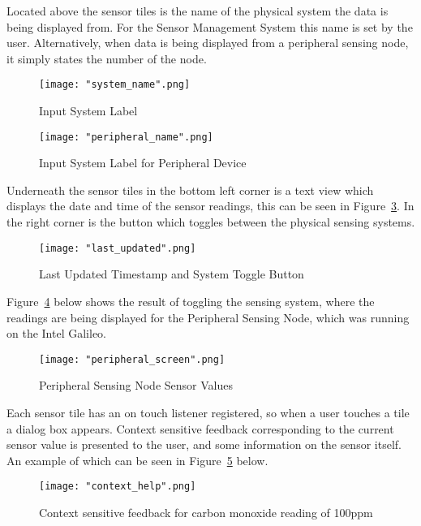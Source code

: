 \documentclass{article}
\begin{document}
\noindent
Located above the sensor tiles is the name of the physical system the data is being displayed from. For the Sensor Management System this name is set by the user. Alternatively, when data is being displayed from a peripheral sensing node, it simply states the number of the node.
\begin{figure}[H]
\centering
\texttt{[image: "system\_name".png]}
\caption{Input System Label}
\label{fig:android_sensor_input_system}
\end{figure}

\begin{figure}[H]
\centering
\texttt{[image: "peripheral\_name".png]}
\caption{Input System Label for Peripheral Device}
\label{fig:android_sensor_input_system_peripheral}
\end{figure}

\noindent
Underneath the sensor tiles in the bottom left corner is a text view which displays the date and time of the sensor readings, this can be seen in Figure~\ref{fig:android_sensor_timestamp}. In the right corner is the button which toggles between the physical sensing systems.
\begin{figure}[H]
\centering
\texttt{[image: "last\_updated".png]}
\caption{Last Updated Timestamp and System Toggle Button}
\label{fig:android_sensor_timestamp}
\end{figure}

\noindent
Figure~\ref{fig:android_peripheral_sensing_values} below shows the result of toggling the sensing system, where the readings are being displayed for the Peripheral Sensing Node, which was running on the Intel Galileo.
\begin{figure}[H]
\centering
\texttt{[image: "peripheral\_screen".png]}
\caption{Peripheral Sensing Node Sensor Values}
\label{fig:android_peripheral_sensing_values}
\end{figure}

\noindent
Each sensor tile has an on touch listener registered, so when a user touches a tile a dialog box appears. Context sensitive feedback corresponding to the current sensor value is presented to the user, and some information on the sensor itself. An example of which can be seen in Figure~\ref{fig:android_sensor_context_help} below.
\begin{figure}[H]
\centering
\texttt{[image: "context\_help".png]}
\caption{Context sensitive feedback for carbon monoxide reading of 100ppm}
\label{fig:android_sensor_context_help}
\end{figure}
\end{document}
